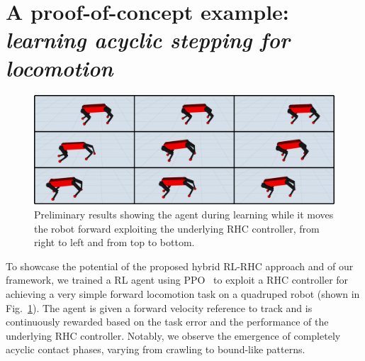 \section{A proof-of-concept example: \textnormal{\textit{learning acyclic stepping for locomotion}}}
\begin{figure}[t]
	\centering
	\includegraphics[width=0.9\columnwidth]{imgs/proof_of_concept.pdf}
	\caption{Preliminary results showing the agent during learning while it moves the robot forward exploiting the underlying RHC controller, from right to left and from top to bottom.}
	\label{fig:proof}
\end{figure}
To showcase the potential of the proposed hybrid RL-RHC approach and of our framework, we trained a RL agent using PPO~\cite{rl:schulman2017proximal} to exploit a RHC controller for achieving a very simple forward locomotion task on a quadruped robot (shown in Fig.~\ref{fig:proof}). The agent is given a forward velocity reference to track and is continuously rewarded based on the task error and the performance of the underlying RHC controller. Notably, we observe the emergence of completely acyclic contact phases, varying from crawling to bound-like patterns.
 